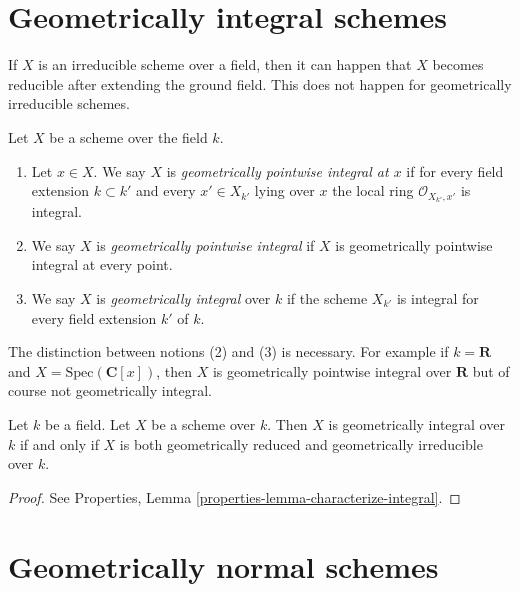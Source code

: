 \section{Geometrically integral schemes}
\label{section-geometrically-integral}

\noindent
If $X$ is an irreducible scheme over a field, then it can happen that $X$
becomes reducible after extending the ground field. This does not happen
for geometrically irreducible schemes.

\begin{definition}
\label{definition-geometrically-integral}
Let $X$ be a scheme over the field $k$.
\begin{enumerate}
\item Let $x \in X$. We say $X$ is
{\it geometrically pointwise integral at $x$} if for every
field extension $k \subset k'$ and every $x' \in X_{k'}$ lying over $x$
the local ring $\mathcal{O}_{X_{k'}, x'}$ is integral.
\item We say $X$ is {\it geometrically pointwise integral} if $X$
is geometrically pointwise integral at every point.
\item We say $X$ is {\it geometrically integral} over $k$ if the scheme
$X_{k'}$ is integral for every field extension $k'$ of $k$.
\end{enumerate}
\end{definition}

\noindent
The distinction between notions (2) and (3) is necessary.
For example if $k = \mathbf{R}$ and $X = \text{Spec}(\mathbf{C}[x])$,
then $X$ is geometrically pointwise integral over $\mathbf{R}$ but
of course not geometrically integral.

\begin{lemma}
\label{lemma-geometrically-integral}
Let $k$ be a field.
Let $X$ be a scheme over $k$.
Then $X$ is geometrically integral over $k$ if and only if
$X$ is both geometrically reduced and geometrically irreducible
over $k$.
\end{lemma}

\begin{proof}
See Properties, Lemma \ref{properties-lemma-characterize-integral}.
\end{proof}





\section{Geometrically normal schemes}
\label{section-geometrically-normal}

